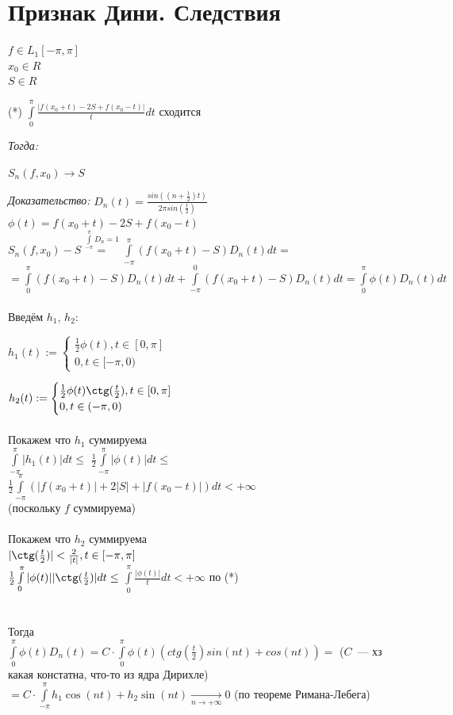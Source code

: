\documentclass[paper=a4, fontsize=17pt]{article}
\begin{document}
\section{Признак Дини. Следствия}

$ f \in L_1[-\pi, \pi] $\\
$ x_0 \in R $\\
$ S \in R $

(*) $ \int\limits_{0}^{\pi} \frac{|f(x_0 + t) - 2S + f(x_0 - t)|}{t} dt $ сходится

\emph{Тогда:}

$ S_n(f, x_0) \to S $

\emph{Доказательство:}
$ D_n(t) = \frac{sin((n + \frac{1}{2})t)}{2\pi sin(\frac{t}{2})} $\\
$ \phi(t) = f(x_0 + t) - 2S + f(x_0 - t) $\\
$ S_n(f, x_0) - S \overset{\int\limits_{-\pi}^{\pi}D_n = 1}{=} \int\limits_{-\pi}^{\pi} (f(x_0 + t) - S) D_n(t) dt =$\\
$ = \int\limits_{0}^{\pi} (f(x_0 + t) - S) D_n(t) dt + \int\limits_{-\pi}^{0} (f(x_0 + t) - S) D_n(t) dt
 = \int\limits_{0}^{\pi} \phi(t) D_n(t) dt $
\\\\
Введём $h_1$, $h_2$:

$ h_1(t) := 
    \begin{cases}
        \frac{1}{2} \phi(t), t \in [0, \pi] \\
        0, t \in [-\pi,0)
    \end{cases}
$

$ h_2(t) := 
    \begin{cases}
        \frac{1}{2} \phi(t) \ctg(\frac{t}{2}), t \in [0, \pi] \\
        0, t \in (-\pi,0)
    \end{cases}
$
\\\\
Покажем что $ h_1 $ суммируема \\
$ \int\limits_{-\pi}^{\pi} |h_1(t)| dt \leq $
$ \frac{1}{2} \int\limits_{-\pi}^{\pi} |\phi(t)| dt \leq $
$ \frac{1}{2} \int\limits_{-\pi}^{\pi} (|f(x_0 + t)| + 2|S| + |f(x_0 - t)|) dt < +\infty $\\
(поскольку $f$ суммируема)
\\\\
Покажем что $ h_2 $ суммируема \\
$ |\ctg(\frac{t}{2})| < \frac{2}{|t|}, t \in [-\pi, \pi] $\\
$ \frac{1}{2} \int\limits_{0}^{\pi} |\phi(t)| |\ctg(\frac{t}{2})| dt \leq $
$ \int\limits_{0}^{\pi} \frac{|\phi(t)|}{t} dt < +\infty $ по (*)\\
\\\\
Тогда \\
$ \int\limits_0^\pi \phi(t)D_n(t) = C \cdot \int\limits_0^\pi \phi(t)(ctg(\frac{t}{2}) sin(nt) + cos(nt)) =$ ($C$~--- хз какая констатна, что-то из ядра Дирихле)\\
$= C \cdot \int\limits_{-\pi}^\pi h_1\cos(nt) + h_2\sin(nt) \xrightarrow[n \to +\infty]{} 0 $ (по теореме Римана-Лебега)\\
\end{document}

